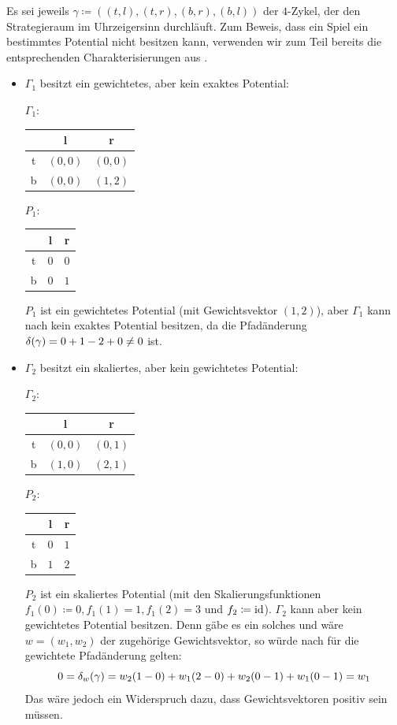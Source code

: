 \begin{bsp}\label{bsp:PotentialInklusionen}
	Es sei jeweils $\gamma \coloneqq ((t,l), (t,r), (b,r), (b,l))$ der $4$-Zykel, der den Strategieraum im Uhrzeigersinn durchläuft. Zum Beweis, dass ein Spiel ein bestimmtes Potential nicht besitzen kann, verwenden wir zum Teil bereits die entsprechenden Charakterisierungen aus .
	\begin{itemize}
		\item $\Gamma_1$ besitzt ein gewichtetes, aber kein exaktes Potential:
			\begin{center}
				$\Gamma_1:$ \quad
				\begin{tabular}{c||c|c}
					& l 		& r 		\\\hline\hline
					t	& $(0,0)$	& $(0,0)$	\\\hline
					b	& $(0,0)$	& $(1,2)$ 
				\end{tabular}\hspace{5em}
				$P_1:$ \quad
				\begin{tabular}{c||c|c}
					& l 		& r 		\\\hline\hline
					t	& $0$	& $0$	\\\hline
					b	& $0$	& $1$ 
				\end{tabular}
			\end{center}
			$P_1$ ist ein gewichtetes Potential (mit Gewichtsvektor $(1,2)$), aber $\Gamma_1$ kann nach  kein exaktes Potential besitzen, da die Pfadänderung $\delta(\gamma) = 0 + 1 - 2 + 0 \neq 0$ ist.
		
		\item $\Gamma_2$ besitzt ein skaliertes, aber kein gewichtetes Potential:
			\begin{center}
				$\Gamma_2:$ \quad
				\begin{tabular}{c||c|c}
					& l 		& r 		\\\hline\hline
					t	& $(0,0)$	& $(0,1)$	\\\hline
					b	& $(1,0)$	& $(2,1)$ 
				\end{tabular}\hspace{5em}
				$P_2:$ \quad
				\begin{tabular}{c||c|c}
					& l 		& r 		\\\hline\hline
					t	& $0$	& $1$	\\\hline
					b	& $1$	& $2$ 
				\end{tabular}
			\end{center}
			$P_2$ ist ein skaliertes Potential (mit den Skalierungsfunktionen $f_1(0) \coloneqq 0, f_1(1) = 1, f_1(2) = 3$ und $f_2 \coloneqq \mathrm{id}$). $\Gamma_2$ kann aber kein gewichtetes Potential besitzen. Denn gäbe es ein solches und wäre $w = (w_1, w_2)$ der zugehörige Gewichtsvektor, so würde nach  für die gewichtete Pfadänderung gelten:
				\[0 = \delta_w(\gamma) = w_2(1-0) + w_1(2-0) + w_2(0-1) + w_1(0-1) = w_1 \]
			Das wäre jedoch ein Widerspruch dazu, dass Gewichtsvektoren positiv sein müssen.
			

\end{itemize}
\end{bsp}
